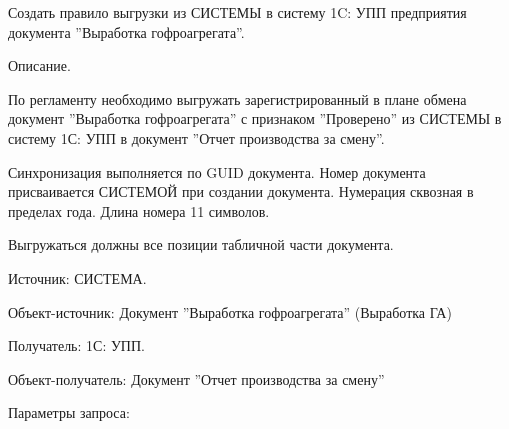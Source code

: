 
Создать правило выгрузки из СИСТЕМЫ в систему  1C: УПП предприятия документа ''Выработка гофроагрегата''.


Описание.

По регламенту необходимо выгружать зарегистрированный в плане обмена документ ''Выработка гофроагрегата'' с признаком ''Проверено'' из СИСТЕМЫ в систему 1С: УПП в документ ''Отчет производства за смену''.

Синхронизация выполняется по GUID документа.
Номер документа присваивается СИСТЕМОЙ при создании документа. Нумерация сквозная в пределах года. Длина номера 11 символов.

Выгружаться должны все позиции табличной части документа.


Источник: СИСТЕМА.

Объект-источник: Документ ''Выработка гофроагрегата'' (Выработка ГА)

Получатель: 1С: УПП.

Объект-получатель: Документ ''Отчет производства за смену''

Параметры запроса:

